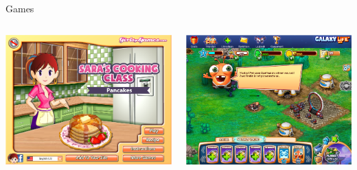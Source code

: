\documentclass[aspectratio=43]{beamer}
\begin{document}
\begin{frame}{Games}
    \begin{columns}
        \begin{column}[c]{0.5\textwidth}
            \includegraphics[width=\textwidth]{images/sarah.png}
        \end{column}
        \begin{column}[c]{0.5\textwidth}
            \includegraphics[width=\textwidth]{images/galaxylife.png}
        \end{column}
    \end{columns}
\end{frame}
\end{document}
